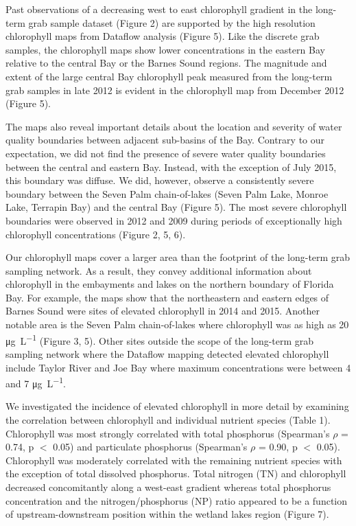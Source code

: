 Past observations of a decreasing west to east chlorophyll gradient in the long-term grab sample dataset (Figure 2) are supported by the high resolution chlorophyll maps from Dataflow analysis (Figure 5). Like the discrete grab samples, the chlorophyll maps show lower concentrations in the eastern Bay relative to the central Bay or the Barnes Sound regions. The magnitude and extent of the large central Bay chlorophyll peak measured from the long-term grab samples in late 2012 is evident in the chlorophyll map from December 2012 (Figure 5). 

The maps also reveal important details about the location and severity of water quality boundaries between adjacent sub-basins of the Bay. Contrary to our expectation, we did not find the presence of severe water quality boundaries between the central and eastern Bay. Instead, with the exception of July 2015, this boundary was diffuse. We did, however, observe a consistently severe boundary between the Seven Palm chain-of-lakes (Seven Palm Lake, Monroe Lake, Terrapin Bay) and the central Bay (Figure 5). The most severe chlorophyll boundaries were observed in 2012 and 2009 during periods of exceptionally high chlorophyll concentrations (Figure 2, 5, 6). 

Our chlorophyll maps cover a larger area than the footprint of the long-term grab sampling network. As a result, they convey additional information about chlorophyll in the embayments and lakes on the northern boundary of Florida Bay. For example, the maps show that the northeastern and eastern edges of Barnes Sound were sites of elevated chlorophyll in 2014 and 2015. Another notable area is the Seven Palm chain-of-lakes where chlorophyll was as high as 20 \si{\micro\gram\per\liter} (Figure 3, 5). Other sites outside the scope of the long-term grab sampling network where the Dataflow mapping detected elevated chlorophyll include Taylor River and Joe Bay where maximum concentrations were between 4 and 7 \si{\micro\gram\per\liter}. 

We investigated the incidence of elevated chlorophyll in more detail by examining the correlation between chlorophyll and individual nutrient species (Table 1). Chlorophyll was most strongly correlated with total phosphorus (Spearman's $\rho$ = 0.74, p $<$ 0.05) and particulate phosphorus (Spearman's $\rho$ = 0.90, p $<$ 0.05). Chlorophyll was moderately correlated with the remaining nutrient species with the exception of total dissolved phosphorus. Total nitrogen (TN) and chlorophyll decreased concomitantly along a west-east gradient whereas total phosphorus concentration and the nitrogen/phosphorus (NP) ratio appeared to be a function of upstream-downstream position within the wetland lakes region (Figure 7).  

